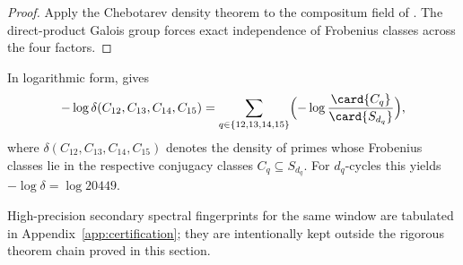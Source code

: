 \begin{proof}
Apply the Chebotarev density theorem \cite{Neukirch1999} to the compositum
field of .  The direct-product Galois group
forces exact independence of Frobenius classes across the four factors.
\end{proof}

\begin{remark}
\label{rem:log-density-additivity}
In logarithmic form,  gives
\[
  -\log \delta(C_{12},C_{13},C_{14},C_{15})
  =
  \sum_{q\in\{12,13,14,15\}}
  \Bigl(-\log \frac{\card{C_q}}{\card{S_{d_q}}}\Bigr),
\]
where \(\delta(C_{12},C_{13},C_{14},C_{15})\) denotes the density of primes
whose Frobenius classes lie in the respective conjugacy classes
\(C_q\subseteq S_{d_q}\).  For \(d_q\)-cycles this yields
\(-\log \delta = \log 20449\).
\end{remark}

High-precision secondary spectral fingerprints for the same window are
tabulated in Appendix~\ref{app:certification}; they are intentionally kept
outside the rigorous theorem chain proved in this section.
